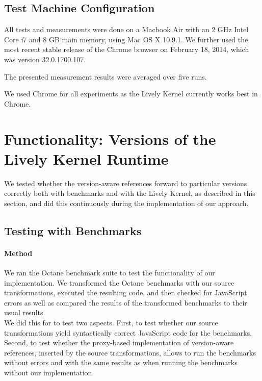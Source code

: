 \subsection{Test Machine Configuration}

All tests and measurements were done on a Macbook Air with an 2 GHz Intel Core i7 and 8 GB main memory, using Mac OS X 10.9.1.
We further used the most recent stable release of the Chrome browser on February 18, 2014, which was version 32.0.1700.107.

The presented measurement results were averaged over five runs.

We used Chrome for all experiments as the Lively Kernel currently works best in Chrome.







\section{Functionality: Versions of the Lively Kernel Runtime} \label{sec:DISCUSSION:1}

We tested whether the version-aware references forward to particular versions correctly both with benchmarks and with the Lively Kernel, as described in this section, and did this continuously during the implementation of our approach.

\subsection{Testing with Benchmarks}

\paragraph{Method}
We ran the Octane benchmark suite to test the functionality of our implementation.
We transformed the Octane benchmarks with our source transformations, executed the resulting code, and then checked for JavaScript errors as well as compared the results of the transformed benchmarks to their usual results.\\
We did this for to test two aspects.
First, to test whether our source transformations yield syntactically correct JavaScript code for the benchmarks.
Second, to test whether the proxy-based implementation of version-aware references, inserted by the source transformations, allows to run the benchmarks without errors and with the same results as when running the benchmarks without our implementation.


